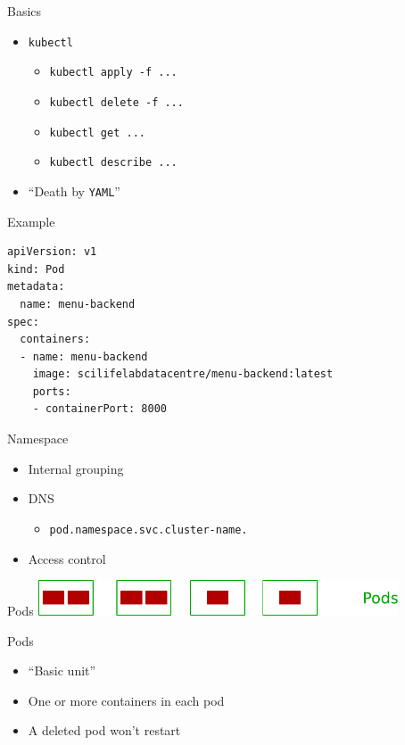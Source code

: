 \documentclass{dcpresentation}
\begin{document}
 \begin{frame}{Basics}
  \begin{itemize}
   \item \texttt{kubectl}
   \begin{itemize}
    \item \texttt{kubectl apply -f ...}
    \item \texttt{kubectl delete -f ...}
    \item \texttt{kubectl get ...}
    \item \texttt{kubectl describe ...}
   \end{itemize}
   \item ``Death by \texttt{YAML}''
  \end{itemize}
 \end{frame}
  
 \begin{frame}[fragile]{Example}
  \small
  \begin{verbatim}
apiVersion: v1
kind: Pod
metadata:
  name: menu-backend
spec:
  containers:
  - name: menu-backend
    image: scilifelabdatacentre/menu-backend:latest
    ports:
    - containerPort: 8000
  \end{verbatim}
 \end{frame}
 
 \begin{frame}{Namespace}
  \begin{itemize}
   \item Internal grouping
   \item DNS
   \begin{itemize}
    \item \texttt{pod.namespace.svc.cluster-name.}
   \end{itemize}
   \item Access control
  \end{itemize}
 \end{frame}
 
  \begin{frame}{Pods}
  \centering
  \includegraphics[width=0.8\textwidth]{img/arch-p.pdf}
 \end{frame}
 
 \begin{frame}{Pods}
  \begin{itemize}
   \item ``Basic unit''
   \item One or more containers in each pod
   \item A deleted pod won't restart
  \end{itemize}
 \end{frame}
 
\end{document}
